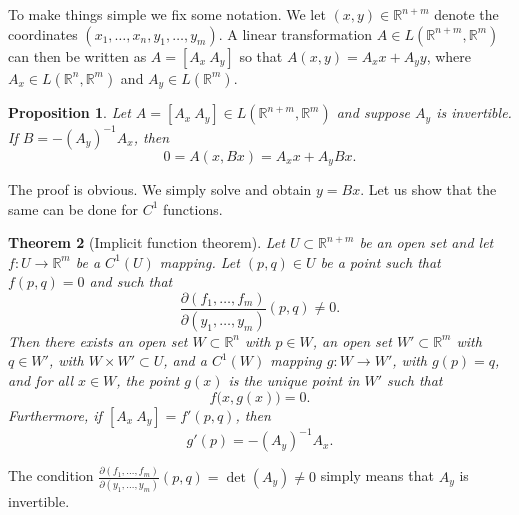 \documentclass[12pt]{book}
\newcommand{\R}{{\mathbb{R}}}
\theoremstyle{plain}
\newtheorem{thm}{Theorem}[section]
\newtheorem{prop}[thm]{Proposition}
\theoremstyle{remark}
\theoremstyle{definition}
\theoremstyle{exercise}
\theoremstyle{example}
\begin{document}
To make things simple we fix some notation.  We let $(x,y) \in
\R^{n+m}$ denote the coordinates $(x_1,\ldots,x_n,y_1,\ldots,y_m)$.  A
linear transformation $A \in L(\R^{n+m},\R^m)$ can then 
be written as
$A = [ A_x ~ A_y ]$ so that $A(x,y) = A_x x + A_y y$,
where $A_x \in L(\R^n,\R^m)$ and
$A_y \in L(\R^m)$.

\begin{prop}
Let $A = [A_x~A_y] \in L(\R^{n+m},\R^m)$ and suppose 
$A_y$ is invertible.  If $B = - {(A_y)}^{-1} A_x$, then
\begin{equation*}
0 = A ( x, Bx) = A_x x + A_y Bx .
\end{equation*}
\end{prop}

The proof is obvious.  We simply solve and obtain $y = Bx$.  Let us
show that the same can be done for $C^1$ functions.

\begin{thm}[Implicit function theorem]
\label{thm:implicit}
Let $U \subset \R^{n+m}$ be an open set and let $f \colon U \to \R^m$
be a $C^1(U)$ mapping.  Let $(p,q) \in U$ be a point such that
$f(p,q) = 0$ and such that
\begin{equation*}
\frac{\partial(f_1,\ldots,f_m)}{\partial(y_1,\ldots,y_m)} (p,q)  \neq 0 .
\end{equation*}
Then there exists an
open set $W \subset \R^n$ with $p \in W$,
an open set $W' \subset \R^m$ with $q \in W'$,
with $W \times W' \subset U$,
and
a $C^1(W)$ mapping $g \colon W \to W'$, with $g(p) = q$, and
for all $x \in W$, the point $g(x)$ is the unique point in $W'$
such that 
\begin{equation*}
f\bigl(x,g(x)\bigr) = 0 .
\end{equation*}
Furthermore, if $[ A_x ~ A_y ] = f'(p,q)$, then
\begin{equation*}
g'(p) = -{(A_y)}^{-1}A_x .
\end{equation*}
\end{thm}


The condition
$\frac{\partial(f_1,\ldots,f_m)}{\partial(y_1,\ldots,y_m)} (p,q) =
\det(A_y)  \neq 0$
simply means that $A_y$ is invertible.
\end{document}
